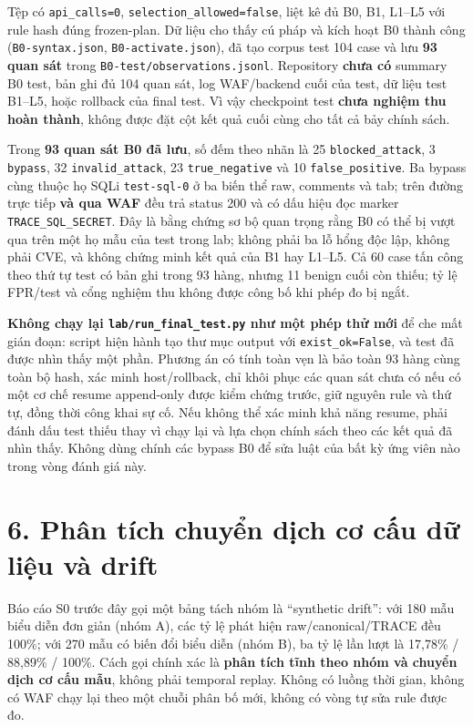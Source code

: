 \documentclass[
  10pt,
  a4paper,
]{article}
\begin{document}
Tệp  có
\texttt{api\_calls=0}, \texttt{selection\_allowed=false}, liệt kê đủ B0,
B1, L1--L5 với rule hash đúng frozen-plan. Dữ liệu cho thấy cú pháp và
kích hoạt B0 thành công (\texttt{B0-syntax.json},
\texttt{B0-activate.json}), đã tạo corpus test 104 case và lưu
\textbf{93 quan sát} trong \texttt{B0-test/observations.jsonl}.
Repository \textbf{chưa có} summary B0 test, bản ghi đủ 104 quan sát,
log WAF/backend cuối của test, dữ liệu test B1--L5, hoặc rollback của
final test. Vì vậy checkpoint test \textbf{chưa nghiệm thu hoàn thành},
không được đặt cột kết quả cuối cùng cho tất cả bảy chính sách.

Trong \textbf{93 quan sát B0 đã lưu}, số đếm theo nhãn là 25
\texttt{blocked\_attack}, 3 \texttt{bypass}, 32
\texttt{invalid\_attack}, 23 \texttt{true\_negative} và 10
\texttt{false\_positive}. Ba bypass cùng thuộc họ SQLi
\texttt{test-sql-0} ở ba biến thể raw, comments và tab; trên đường trực
tiếp \textbf{và qua WAF} đều trả status 200 và có dấu hiệu đọc marker
\texttt{TRACE\_SQL\_SECRET}. Đây là bằng chứng sơ bộ quan trọng rằng B0
có thể bị vượt qua trên một họ mẫu của test trong lab; không phải ba lỗ
hổng độc lập, không phải CVE, và không chứng minh kết quả của B1 hay
L1--L5. Cả 60 case tấn công theo thứ tự test có bản ghi trong 93 hàng,
nhưng 11 benign cuối còn thiếu; tỷ lệ FPR/test và cổng nghiệm thu không
được công bố khi phép đo bị ngắt.

\textbf{Không chạy lại \texttt{lab/run\_final\_test.py} như một phép thử
mới} để che mất gián đoạn: script hiện hành tạo thư mục output với
\texttt{exist\_ok=False}, và test đã được nhìn thấy một phần. Phương án
có tính toàn vẹn là bảo toàn 93 hàng cùng toàn bộ hash, xác minh
host/rollback, chỉ khôi phục các quan sát chưa có nếu có một cơ chế
resume append-only được kiểm chứng trước, giữ nguyên rule và thứ tự,
đồng thời công khai sự cố. Nếu không thể xác minh khả năng resume, phải
đánh dấu test thiếu thay vì chạy lại và lựa chọn chính sách theo các kết
quả đã nhìn thấy. Không dùng chính các bypass B0 để sửa luật của bất kỳ
ứng viên nào trong vòng đánh giá này.

\section{6. Phân tích chuyển dịch cơ cấu dữ liệu và
drift}\label{phuxe2n-tuxedch-chuyux1ec3n-dux1ecbch-cux1a1-cux1ea5u-dux1eef-liux1ec7u-vuxe0-drift}

Báo cáo S0 trước đây gọi một bảng tách nhóm là ``synthetic drift'': với
180 mẫu biểu diễn đơn giản (nhóm A), các tỷ lệ phát hiện
raw/canonical/TRACE đều 100\%; với 270 mẫu có biến đổi biểu diễn (nhóm
B), ba tỷ lệ lần lượt là 17,78\% / 88,89\% / 100\%. Cách gọi chính xác
là \textbf{phân tích tĩnh theo nhóm và chuyển dịch cơ cấu mẫu}, không
phải temporal replay. Không có luồng thời gian, không có WAF chạy lại
theo một chuỗi phân bố mới, không có vòng tự sửa rule được đo.
\end{document}
